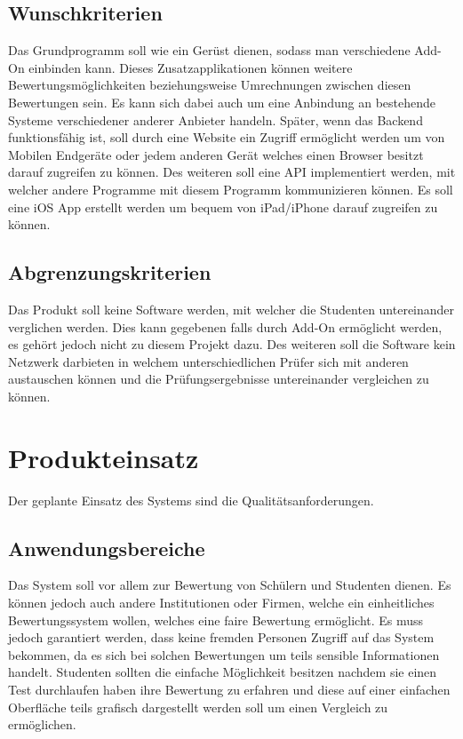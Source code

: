 \documentclass[a4paper,listof=leveldown,listof=numbered]{scrreprt}
\begin{document}
	\section{Wunschkriterien}
	Das Grundprogramm soll wie ein Gerüst dienen, sodass man verschiedene \acs{Add-On} einbinden kann. Dieses Zusatzapplikationen können weitere Bewertungsmöglichkeiten beziehungsweise Umrechnungen zwischen diesen Bewertungen sein. Es kann sich dabei auch um eine Anbindung an bestehende Systeme verschiedener anderer Anbieter handeln. Später, wenn das Backend funktionsfähig ist, soll durch eine Website ein Zugriff ermöglicht werden um von Mobilen Endgeräte oder jedem anderen Gerät welches einen Browser besitzt darauf zugreifen zu können. Des weiteren soll eine \ac{API} implementiert werden, mit welcher andere Programme mit diesem Programm kommunizieren können. Es soll eine iOS App erstellt werden um bequem von iPad/iPhone darauf zugreifen zu können.
	
	\section{Abgrenzungskriterien}
	Das Produkt soll keine Software werden, mit welcher die Studenten untereinander verglichen werden. Dies kann gegebenen falls durch \acs{Add-On} ermöglicht werden, es gehört jedoch nicht zu diesem Projekt dazu. Des weiteren soll die Software kein Netzwerk darbieten in welchem unterschiedlichen Prüfer sich mit anderen austauschen können und die Prüfungsergebnisse untereinander vergleichen zu können.
	
\chapter{Produkteinsatz}
	Der geplante Einsatz des Systems sind die Qualitätsanforderungen.
	
	\section{Anwendungsbereiche}
	Das System soll vor allem zur Bewertung von Schülern und Studenten dienen. Es können jedoch auch andere Institutionen oder Firmen, welche ein einheitliches Bewertungssystem wollen, welches eine faire Bewertung ermöglicht. Es muss jedoch garantiert werden, dass keine fremden Personen Zugriff auf das System bekommen, da es sich bei solchen Bewertungen um teils sensible Informationen handelt. Studenten sollten die einfache Möglichkeit besitzen nachdem sie einen Test durchlaufen haben ihre Bewertung zu erfahren und diese auf einer einfachen Oberfläche teils grafisch dargestellt werden soll um einen Vergleich zu ermöglichen.
	
\end{document}
